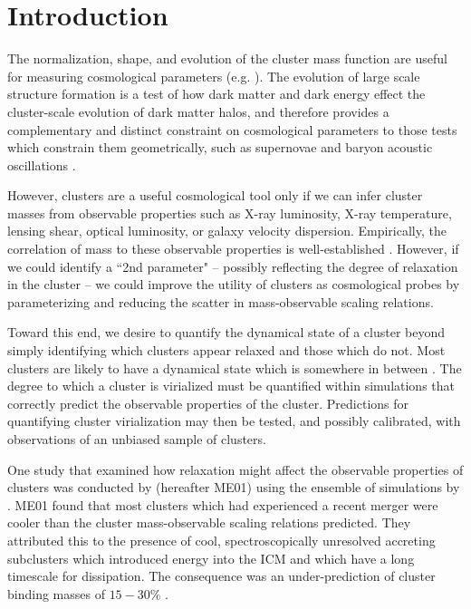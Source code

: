 \documentclass[12pt,preprint]{aastex}
\begin{document}
\section{Introduction}\label{sec:intro}

The normalization, shape, and evolution of the cluster mass function
are useful for measuring cosmological parameters
(e.g. \citealt{1989ApJ...341L..71E, 1998ApJ...508..483W,
2001ApJ...553..545H,  2004PhRvD..70l3008W}). The evolution of large
scale structure formation is a test of how dark matter and dark energy
effect the cluster-scale evolution of dark matter halos, and therefore
provides a complementary and distinct constraint on cosmological
parameters to those tests which constrain them geometrically,
such as supernovae \citep{1998AJ....116.1009R, 2007ApJ...659...98R}
and baryon acoustic oscillations \citep{2005ApJ...633..560E}.

However, clusters are a useful cosmological tool only if we can infer
cluster masses from observable properties such as X-ray luminosity,
X-ray temperature, lensing shear, optical luminosity, or galaxy
velocity dispersion. Empirically, the correlation of mass to these
observable properties is well-established
\citep{2005RvMP...77..207V}. However, if we could identify a ``2nd
parameter" -- possibly reflecting the degree of relaxation in the
cluster -- we could improve the utility of clusters as cosmological
probes by parameterizing and reducing the scatter in mass-observable
scaling relations.

Toward this end, we desire to quantify the dynamical state of a
cluster beyond simply identifying which clusters appear relaxed and
those which do not. Most clusters are likely to have a dynamical state
which is somewhere in between \citep{2006ApJ...639...64O,
2006ApJ...650..128K}. The degree to which a cluster is virialized must
be quantified within simulations that correctly predict the observable
properties of the cluster. Predictions for quantifying cluster
virialization may then be tested, and possibly calibrated, with
observations of an unbiased sample of clusters.

One study that examined how relaxation might affect the observable
properties of clusters was conducted by \citealt{2001ApJ...546..100M}
(hereafter ME01) using the ensemble of simulations by
\citealt{1997ApJ...491...38M}. ME01 found that most clusters which had
experienced a recent merger were cooler than the cluster
mass-observable scaling relations predicted. They attributed this to the
presence of cool, spectroscopically unresolved accreting subclusters
which introduced energy into the ICM and which have a long timescale for
dissipation. The consequence was an under-prediction of cluster
binding masses of $15-30\%$ \citep{2001ApJ...546..100M}.
\end{document}
